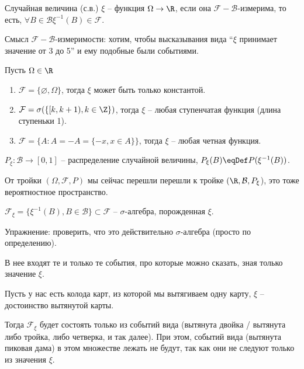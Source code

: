 \begin{Def}
Случайная величина (с.в.) $\xi$ -- функция $\Omega \to \R$, если она $\mathcal{F}-\mathcal{B}$-измерима, 
то есть, $\forall B \in \mathcal{B} \xi^{-1}(B) \in \mathcal{F}$.
\end{Def}
\begin{Rem}
Смысл $\mathcal{F}-\mathcal{B}$-измеримости: хотим, чтобы высказывания вида ``$\xi$ принимает значение от 3 до 5'' и ему подобные были событиями.
\end{Rem}
\begin{exmp}
Пусть $\Omega \in \R$
\begin{enumerate}
\item $\mathcal{F} = \{\varnothing, \Omega\}$, тогда $\xi$ может быть только константой.
\item $\mathcal{F} = \sigma(\{[k, k + 1), k \in \Z\})$, тогда $\xi$ -- любая ступенчатая функция (длина ступеньки 1).
\item $\mathcal{F} = \{A\colon A = -A = \{-x, x \in A\}\}$, тогда $\xi$ -- любая четная функция.
\end{enumerate}
\end{exmp}

\begin{Def}
$P_{\xi}\colon \mathcal{B} \to [0, 1]$ -- распределение случайной величины, $P_{\xi}(B) \eqDef P(\xi^{-1}(B))$.
\end{Def}

От тройки $(\Omega, \mathcal{F}, P)$ мы сейчас перешли перешли к тройке $(\R, \mathcal{B}, P_{\xi}$), это тоже вероятностное пространство.

\begin{Def}
$\mathcal{F}_{\xi} = \{ \xi^{-1}(B), B \in \mathcal{B} \} \subset \mathcal{F}$ -- $\sigma$-алгебра, порожденная $\xi$. 
\end{Def}
Упражнение: проверить, что это действительно $\sigma$-алгебра (просто по определению).
\begin{Rem}
В нее входят те и только те события, про которые можно сказать, зная только значение $\xi$.
\end{Rem}
\begin{exmp}
Пусть у нас есть колода карт, из которой мы вытягиваем одну карту, $\xi$ -- достоинство вытянутой карты.

Тогда $\mathcal{F}_{\xi}$ будет состоять только из событий вида (вытянута двойка / вытянута либо тройка, либо четверка, и так далее).
При этом, событий вида (вытянута пиковая дама) в этом множестве лежать не будут, так как они не следуют только из значения $\xi$.
\end{exmp}

